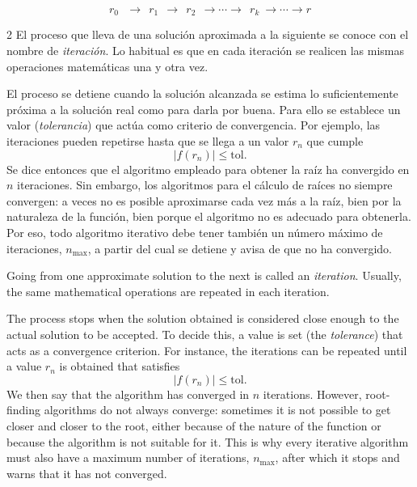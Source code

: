 \begin{equation*}
r_0\ \ \  \rightarrow \  \ r_1  \ \ \rightarrow \ \ r_2 \ \ \rightarrow \cdots \rightarrow \ \ r_k \ \rightarrow \cdots \rightarrow r
\end{equation*}
\begin{paracol}{2}
El proceso que lleva de una solución aproximada a la siguiente se conoce con el nombre de \emph{iteración}. Lo habitual es que en cada iteración se realicen las mismas operaciones matemáticas una y otra vez.

El proceso se detiene cuando la solución alcanzada se estima lo suficientemente próxima a la solución real como para darla por buena. Para ello se establece un valor (\emph{tolerancia}) que actúa como criterio de convergencia. Por ejemplo, las iteraciones pueden repetirse hasta que se llega a un valor $r_n$ que cumple
\begin{equation*}
\vert f(r_n) \vert \leq \text{tol}.
\end{equation*}
Se dice entonces que el algoritmo empleado para obtener la raíz ha convergido en $n$ iteraciones. Sin embargo, los algoritmos para el cálculo de raíces no siempre convergen: a veces no es posible aproximarse cada vez más a la raíz, bien por la naturaleza de la función, bien porque el algoritmo no es adecuado para obtenerla. Por eso, todo algoritmo iterativo debe tener también un número máximo de iteraciones, $n_{\max}$, a partir del cual se detiene y avisa de que no ha convergido.
\switchcolumn

Going from one approximate solution to the next is called an \emph{iteration}. Usually, the same mathematical operations are repeated in each iteration.

The process stops when the solution obtained is considered close enough to the actual solution to be accepted. To decide this, a value is set (the \emph{tolerance}) that acts as a convergence criterion. For instance, the iterations can be repeated until a value $r_n$ is obtained that satisfies
\begin{equation*}
\vert f(r_n) \vert \leq \text{tol}.
\end{equation*}
We then say that the algorithm has converged in $n$ iterations. However, root-finding algorithms do not always converge: sometimes it is not possible to get closer and closer to the root, either because of the nature of the function or because the algorithm is not suitable for it. This is why every iterative algorithm must also have a maximum number of iterations, $n_{\max}$, after which it stops and warns that it has not converged.
\end{paracol}


